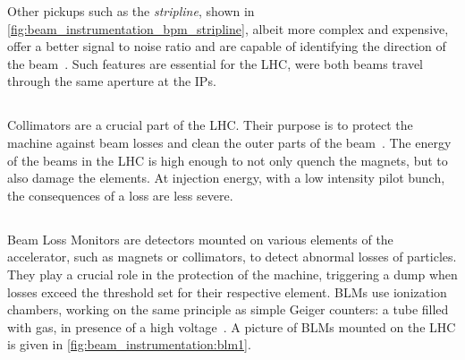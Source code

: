 Other pickups such as the \textit{stripline}, shown in
\cref{fig:beam_instrumentation_bpm_stripline}, albeit more complex and expensive, offer a better
signal to noise ratio and are capable of identifying the direction of the
beam~\cite{wendt_bpm_2020}. Such features are essential for the LHC, were both beams travel through
the same aperture at the IPs.\\ 


 
\FloatBarrier
\subsection{}

Collimators are a crucial part of the LHC. Their purpose is to protect the machine against beam
losses and clean the outer parts of the beam~\cite{redaelli_lhc_2011}. The energy of the beams in
the LHC is high enough to not only quench the magnets, but to also damage the elements. At
injection energy, with a low intensity pilot bunch, the consequences of a loss are less severe.



\subsection{}

Beam Loss Monitors are detectors mounted on various elements of the accelerator, such as magnets or
collimators, to detect abnormal losses of particles. They play a crucial role in the protection of
the machine, triggering a dump when losses exceed the threshold set for their respective element. 
BLMs use ionization chambers, working on the same principle as simple Geiger counters: a tube filled
with gas, in presence of a high voltage~\cite{schmidt_machine_2014}. A picture of BLMs mounted on
the LHC is given in \cref{fig:beam_instrumentation:blm1}.

